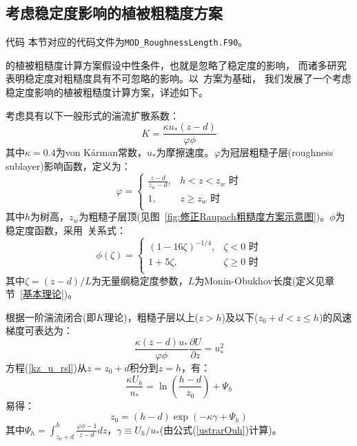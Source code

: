 \subsection{考虑稳定度影响的植被粗糙度方案}\label{考虑稳定度粗糙度方案}
\begin{mymdframed}{代码}
本节对应的代码文件为\texttt{MOD\_RoughnessLength.F90}。
\end{mymdframed}

\citet{raupach1992drag,raupach1994simplified}的植被粗糙度计算方案假设中性条件，也就是忽略了稳定度的影响，
而诸多研究表明稳定度对粗糙度具有不可忽略的影响。以~\citet{raupach1992drag,raupach1994simplified}方案为基础，
我们发展了一个考虑稳定度影响的植被粗糙度计算方案，详述如下。

考虑具有以下一般形式的湍流扩散系数：
\begin{equation}\label{eddydiffusivity}
K=\frac{\kappa u_{*} (z-d)} {\varphi \phi }
\end{equation}
其中$\kappa=0.4$为von K\'arman常数，$u_{*}$为摩擦速度。$\varphi$为冠层粗糙子层(roughness sublayer)影响函数，定义为：
\begin{equation}
\varphi = \begin{cases}
   \frac{z-d} {z_{w}-d}, & h<z<z_{w} \text { 时} \\
   1, & z \geqslant z_{w} \text { 时} \\
\end{cases}
\end{equation}
其中$h$为树高，$z_{w}$为粗糙子层顶(见图~\ref{fig:修正Raupach粗糙度方案示意图})。$\phi$为稳定度函数，采用~\citet{dyer1974review}关系式：
\begin{equation}
\phi(\zeta) = \begin{cases}
   (1-16\zeta)^{-1/4}, & \zeta<0 \text { 时} \\
   1+5\zeta, & \zeta \geqslant 0 \text { 时} \\
\end{cases}
\end{equation}
其中$\zeta = (z-d)/L$为无量纲稳定度参数，$L$为Monin-Obukhov长度(定义见章节~\ref{基本理论})。

根据一阶湍流闭合(即$K$理论)，粗糙子层以上($z>h$)及以下($z_0 + d<z \leqslant h$)的风速梯度可表达为：
\begin{equation}\label{kz_u_rsl}
\frac{\kappa (z-d) u_{*}}{\varphi \phi} \frac{\partial U}{\partial z}=u_{*}^2
\end{equation}
方程(\ref{kz_u_rsl})从$z=z_0+d$积分到$z=h$，有：
\begin{equation}\label{u_rsl_htop}
\frac{\kappa U_{h}}{u_{*}} = \ln \left(\frac{h-d}{z_{0}}\right) + \Psi_{h}
\end{equation}
易得：
\begin{equation}\label{z0_rsl}
z_{0} = (h-d)\exp (-\kappa \gamma + \Psi_{h})
\end{equation}
其中$\Psi_{h}=\int_{z_{0}+d}^{h} \frac{\varphi \phi - 1}{z-d} d z$，$\gamma \equiv U_{h}/u_{*}$(由公式(\ref{ustrarOuh})计算)。

